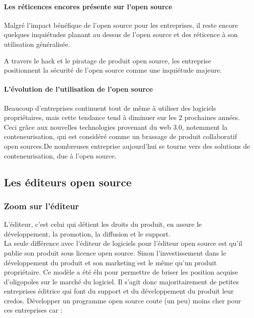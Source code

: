 
			\paragraph{Les réticences encores présente sur l'open source\\}

				Malgré l'impact bénéfique de l'open source pour les entreprises, il reste encore quelques inquiétudes planant au dessus de l'open source et des réticence à son utilisation généralisée.

				A travers le hack et le piratage de produit open source, les entreprise positionnent la sécurité de l'open source comme une inquiétude majeure.


			\paragraph{L'évolution de l'utilisation de l'open source\\}

				Beaucoup d'entreprises continuent tout de même à utiliser des logiciels propriétaires, mais cette tendance tend à diminuer sur les 2 prochaines années. Ceci grâce aux nouvelles technologies provenant du \gls{web 3.0}, notemment la \gls{conteneurisation}, qui est considéré comme un brassage de produit collaboratif open sources.De nombreuses entreprise aujourd'hui se tourne vers des solutions de conteneurisation, due à l'open source.


		\subsection{Les éditeurs open source}

			\subsubsection{Zoom sur l'éditeur}

				L'éditeur, c'est celui qui détient les droits du produit, en assure le développement, la promotion, la diffusion et le support.\\
			
				La seule différence avec l'éditeur de logiciels pour l'éditeur open source est qu'il publie son produit sous licence open source. Sinon l'investissement dans le développement du produit et son marketing est le même qu'un produit propriétaire.
				Ce modèle a été élu pour permettre de briser les position acquise d'oligopoles sur le marché du logiciel.
				Il s'agit donc majoritairement de petites entreprises éditrice qui font du support et du développement du produit leur credos.
				Développer un programme open source coute (un peu) moins cher pour ces entreprises car :

